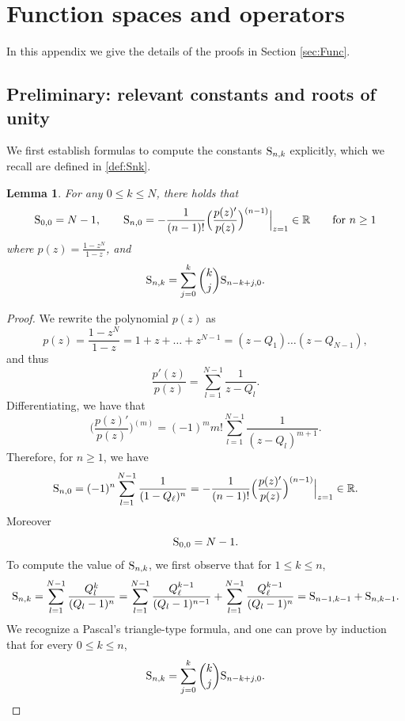 \documentclass[11pt,reqno,a4paper]{amsart}
\def\RR {\mathbb{R}}
\newcommand{\1}{\mathbbm{1}}
\newtheorem{lemma}[proposition]{Lemma}
\theoremstyle{definition}
\theoremstyle{definition}
\numberwithin{equation}{section}
\begin{document}
\FloatBarrier

\appendix

\section{Function spaces and operators}\label{app:functional}
In this appendix we give the details of the proofs in Section \ref{sec:Func}.

\subsection{Preliminary: relevant constants and roots of unity}\label{app:constants}
We first establish formulas to compute the constants ${\rm S}_{n,k}$ explicitly, which we recall are defined in \cref{def:Snk}.
\begin{lemma}
\label{lem:Snk}
    For any $0 \le k \le N$, there holds that
    \begin{equation}
\label{eq:Snn}
    {\rm S}_{0,0
    }=N-1, \qquad {\rm S}_{n,0
    }=-\frac{1}{(n-1)!}\Big(\frac{p(z)'}{p(z)}\Big)^{(n-1)}\Big|_{z=1} \in \RR \qquad \text{for } n\geq1
\end{equation}
where $p(z)=\frac{1-z^N}{1-z}$, and
\begin{equation}
   {\rm  S}_{n,k} = \sum_{j=0}^k \binom{k}{j} {\rm  S}_{n-k+j,0}.
\end{equation}
\end{lemma}
\begin{proof}
We rewrite the polynomial $p(z)$ as \begin{equation}
\label{def:pz}
    p(z)=\frac{1-z^N}{1-z}=1+z+\dots+z^{N-1}=(z-Q_1)\dots (z-Q_{N-1}),
\end{equation}
and thus
\begin{equation}
    \frac{p'(z)}{p(z)}=\sum_{l=1}^{N-1}\frac{1}{z-Q_l}.
\end{equation}
Differentiating, we have that
\begin{equation}
    \Big(\frac{p(z)'}{p(z)}\Big)^{(m)}=(-1)^m m!\sum_{l=1}^{N-1}\frac{1}{(z-Q_l)^{m+1}}.
\end{equation}
Therefore, for $n\geq 1 $, we have
\begin{equation}
\label{eq:Snn}
    {\rm S}_{n,0
    }=(-1)^n\sum_{l=1}^{N-1}\frac{1}{(1-Q_\ell)^n }=-\frac{1}{(n-1)!}\Big(\frac{p(z)'}{p(z)}\Big)^{(n-1)}\Big|_{z=1} \in \RR.
\end{equation}
Moreover 
\begin{equation}
\label{eq:S00}
    {\rm S}_{0,0}=N-1.
\end{equation}
To compute the value of ${\rm S}_{n,k}$, we first observe that for $1 \le k \le n$,
\begin{equation}
    {\rm S}_{n,k}=\sum_{l=1}^{N-1}\frac{Q_l^k}{(Q_l-1)^n}=\sum_{l=1}^{N-1}\frac{Q_\ell^{k-1}}{(Q_l-1)^{n-1}}+\sum_{l=1}^{N-1}\frac{Q_\ell^{k-1}}{(Q_l-1)^{n}}={\rm S}_{n-1,k-1}+{\rm S}_{n,k-1}.
\end{equation}
We recognize a Pascal's triangle-type formula, and one can prove by  induction that for every $0 \le k \le n$,
\begin{equation}
   {\rm  S}_{n,k} = \sum_{j=0}^k \binom{k}{j} {\rm  S}_{n-k+j,0}.
\end{equation}
\end{proof}
\end{document}
